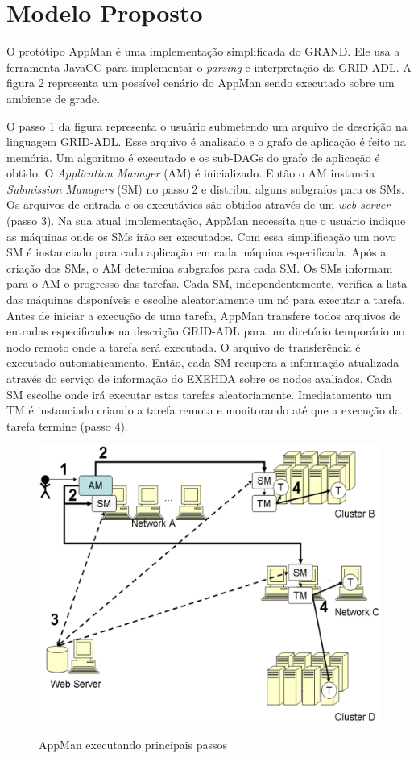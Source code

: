\section{Modelo Proposto}
\label{cap:modelo proposto}


O protótipo AppMan é uma implementação simplificada do GRAND. Ele usa a ferramenta JavaCC para implementar o {\it parsing} e interpretação da GRID-ADL. A figura 2 representa um possível cenário do AppMan sendo executado sobre um ambiente de grade.

O passo 1 da figura representa o usuário submetendo um arquivo de descrição na linguagem GRID-ADL. Esse arquivo é analisado e o grafo de aplicação é feito na memória. Um algoritmo é executado e os sub-DAGs do grafo de aplicação é obtido. O {\it Application Manager} (AM) é inicializado. Então o AM instancia {\it Submission Managers} (SM) no passo 2 e distribui alguns subgrafos para os SMs. Os arquivos de entrada e os executávies são obtidos através de um {\it web server} (passo 3). Na sua atual implementação, AppMan necessita que o usuário indique as máquinas onde os SMs irão ser executados. Com essa simplificação um novo SM é instanciado para cada aplicação em cada máquina especificada. Após a criação dos SMs, o AM determina subgrafos para cada SM. Os SMs informam para o AM o progresso das tarefas. Cada SM, independentemente, verifica a lista das máquinas disponíveis e escolhe aleatoriamente um nó para executar a tarefa. Antes de iniciar a execução de uma tarefa, AppMan transfere todos arquivos de entradas especificados na descrição GRID-ADL para um diretório temporário no nodo remoto onde a tarefa será executada. O arquivo de transferência é executado automaticamento. Então, cada SM recupera a informação atualizada através do serviço de informação do EXEHDA sobre os nodos avaliados. Cada SM escolhe onde irá executar estas tarefas aleatoriamente. Imediatamento um TM é instanciado criando a tarefa remota e monitorando até que a execução da tarefa termine (passo 4).

\begin{figure}[ht]
\center
\includegraphics[scale=.2]{img/AppMan.eps}
\label{AppMan}
\caption{AppMan executando principais passos}
\end{figure}

